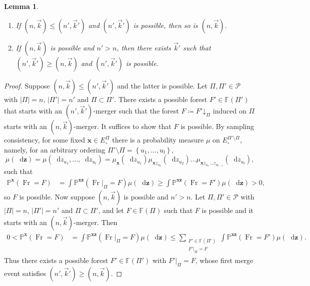 \documentclass[reqno,draft]{amsart}
\numberwithin{equation}{section}
\theoremstyle{plain}
\newtheorem{lemma}[theorem]{Lemma}
\theoremstyle{remark}
\renewcommand{\P}{\mathbb{P}} %
\newcommand*\diff{\mathop{}\!\mathrm{d}}
\newcommand{\fpart}{\Pi} %
\DeclareMathOperator{\fr}{Fr}
\newcommand{\rsto}[1]{\mathord\downarrow_{#1}}
\begin{document}
\begin{lemma}\label{lem:nkle}
    \begin{enumerate}
        \item If $(n,\vec{k}) \le (n',\vec{k}')$ and $(n',\vec{k}')$ is possible, then so is $(n,\vec{k})$.
        \item If $(n,\vec{k})$ is possible and $n' > n$, then there exists $\vec{k}'$ such that $(n',\vec{k}') \ge (n,\vec{k})$ and $(n',\vec{k}')$ is possible.
    \end{enumerate}
\end{lemma}
\begin{proof}
    Suppose $(n,\vec{k}) \le (n',\vec{k}')$ and the latter is possible. Let $\fpart, \fpart'\in \mathcal{P}$ with $|\fpart| = n$, $|\fpart'| = n'$ and $\fpart \subset \fpart'$. There exists a possible forest $F'\in \mathbb{F}(\fpart')$ that starts with an $(n',\vec{k}')$-merger such that the forest $F \coloneqq F'\rsto{\fpart}$ induced on $\fpart$ starts with an $(n,\vec{k})$-merger. It suffices to show that $F$ is possible. By sampling consistency, for some fixed $\boldsymbol x\in E^\fpart_\circ $ there is a probability measure $\mu$ on $E^{\fpart'\setminus \fpart}_\circ $, namely, for an arbitrary ordering $\fpart' \setminus \fpart = \left\{ u_1, \ldots ,u_l \right\} $, \[
        \mu(\diff \boldsymbol z) = \mu(\diff z_{u_1}, \ldots ,\diff z_{u_l}) = \mu_{\boldsymbol x}(\diff z_{u_1}) \mu_{\boldsymbol x z_{u_1}}(\diff z_{u_2}) \ldots \mu_{\boldsymbol x z_{u_1} \ldots z_{u_{l-1}}}(\diff z_{u_l}),
    \]  such that
    \begin{align*}
        \P^{\boldsymbol x}(\fr = F)
        &= \int \P^{\boldsymbol x\boldsymbol z}(\fr \vert_{\fpart}=F) \mu(\diff \boldsymbol z)
        \ge \int \P^{\boldsymbol x\boldsymbol z}(\fr = F') \mu(\diff \boldsymbol z) >0,
    \end{align*}
    so $F$ is possible. Now suppose $(n,\vec{k})$ is possible and $n' > n$. Let $\fpart,\fpart'\in \mathcal{P}$ with $|\fpart| = n$, $|\fpart'| = n'$ and $\fpart\subset \fpart'$, and let $F\in \mathbb{F}(\fpart)$ such that $F$ is possible and it starts with an $(n,\vec{k})$-merger. Then
    \begin{align*}
        0 < \P^{\boldsymbol x}(\fr = F)
        &= \int \P^{\boldsymbol x\boldsymbol z}(\fr\vert_{\fpart}=F) \mu(\diff \boldsymbol z) \le \sum_{\substack{F'\in \mathbb{F}(\fpart') \\ F'\vert_{\fpart} = F} } \int \P^{\boldsymbol x\boldsymbol z}(\fr = F') \mu(\diff \boldsymbol z).
    \end{align*}
    Thus there exists a possible forest $F'\in \mathbb{F}(\fpart')$ with $F'\vert_{\fpart} = F$, whose first merge event satisfies $(n',\vec{k}') \ge (n,\vec{k})$.
\end{proof}
\end{document}
